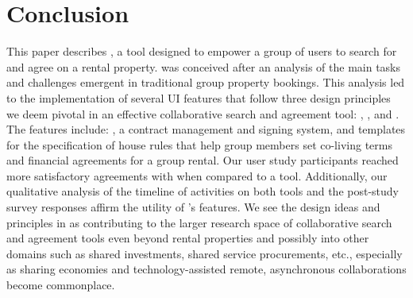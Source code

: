 \section{Conclusion}

This paper describes \tool, a tool designed to empower a group of users to search for and agree on a rental property. \tool was conceived after an analysis of the main tasks and challenges emergent in traditional group property bookings. This analysis led to the implementation of several UI features that follow three design principles we deem pivotal in an effective collaborative search and agreement tool: \pGoalCenteredFlow, 
\pAwareness, and \pMediation. The features include: \cbot, a contract management and signing system, and templates for
the specification of house rules that help group members set co-living terms and financial agreements for a group rental. Our user study participants reached more satisfactory agreements with \tool when compared to a \baseline tool. Additionally, our qualitative analysis of the timeline of activities on both tools and the post-study survey responses affirm the utility of \tool's features. We see the design ideas and principles in \tool as contributing to the larger research space of collaborative search and agreement tools even beyond rental properties and possibly into other domains such as shared investments, shared service procurements, etc., especially as sharing economies and technology-assisted remote, asynchronous collaborations become commonplace.

